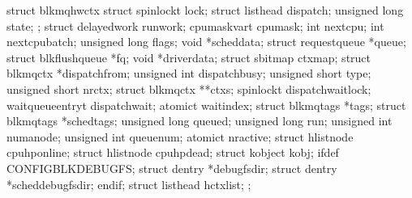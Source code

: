 \documentclass[a4paper,11pt,english]{sphinxmanual}
\begin{document}
\begin{sphinxVerbatim}[commandchars=\\\{\}]
struct blk\PYGZus{}mq\PYGZus{}hw\PYGZus{}ctx \PYGZob{}
    struct \PYGZob{}
        spinlock\PYGZus{}t lock;
        struct list\PYGZus{}head        dispatch;
        unsigned long           state;
    \PYGZcb{};
    struct delayed\PYGZus{}work     run\PYGZus{}work;
    cpumask\PYGZus{}var\PYGZus{}t cpumask;
    int next\PYGZus{}cpu;
    int next\PYGZus{}cpu\PYGZus{}batch;
    unsigned long           flags;
    void *sched\PYGZus{}data;
    struct request\PYGZus{}queue    *queue;
    struct blk\PYGZus{}flush\PYGZus{}queue  *fq;
    void *driver\PYGZus{}data;
    struct sbitmap          ctx\PYGZus{}map;
    struct blk\PYGZus{}mq\PYGZus{}ctx       *dispatch\PYGZus{}from;
    unsigned int            dispatch\PYGZus{}busy;
    unsigned short          type;
    unsigned short          nr\PYGZus{}ctx;
    struct blk\PYGZus{}mq\PYGZus{}ctx       **ctxs;
    spinlock\PYGZus{}t dispatch\PYGZus{}wait\PYGZus{}lock;
    wait\PYGZus{}queue\PYGZus{}entry\PYGZus{}t dispatch\PYGZus{}wait;
    atomic\PYGZus{}t wait\PYGZus{}index;
    struct blk\PYGZus{}mq\PYGZus{}tags      *tags;
    struct blk\PYGZus{}mq\PYGZus{}tags      *sched\PYGZus{}tags;
    unsigned long           queued;
    unsigned long           run;
    unsigned int            numa\PYGZus{}node;
    unsigned int            queue\PYGZus{}num;
    atomic\PYGZus{}t nr\PYGZus{}active;
    struct hlist\PYGZus{}node       cpuhp\PYGZus{}online;
    struct hlist\PYGZus{}node       cpuhp\PYGZus{}dead;
    struct kobject          kobj;
\PYGZsh{}ifdef CONFIG\PYGZus{}BLK\PYGZus{}DEBUG\PYGZus{}FS;
    struct dentry           *debugfs\PYGZus{}dir;
    struct dentry           *sched\PYGZus{}debugfs\PYGZus{}dir;
\PYGZsh{}endif;
    struct list\PYGZus{}head        hctx\PYGZus{}list;
\PYGZcb{};
\end{sphinxVerbatim}
\end{document}

